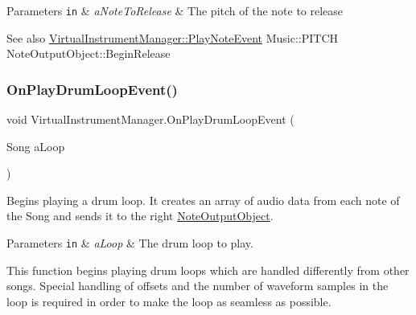 \begin{DoxyParams}[1]{Parameters}
\mbox{\tt in}  & {\em a\+Note\+To\+Release} & The pitch of the note to release\\
\hline
\end{DoxyParams}
\begin{DoxySeeAlso}{See also}
\hyperlink{class_virtual_instrument_manager_1_1_play_note_event}{Virtual\+Instrument\+Manager\+::\+Play\+Note\+Event} Music\+::\+P\+I\+T\+CH Note\+Output\+Object\+::\+Begin\+Release 
\end{DoxySeeAlso}
\mbox{\label{group___virtual_instrument_manager_event_types_gae2e2010b9a36ae2409466181ae0b9679}} 
\subsubsection{\texorpdfstring{On\+Play\+Drum\+Loop\+Event()}{OnPlayDrumLoopEvent()}}
{\footnotesize\ttfamily void Virtual\+Instrument\+Manager.\+On\+Play\+Drum\+Loop\+Event (\begin{DoxyParamCaption}\item[{Song}]{a\+Loop }\end{DoxyParamCaption})}



Begins playing a drum loop. It creates an array of audio data from each note of the Song and sends it to the right \hyperlink{class_note_output_object}{Note\+Output\+Object}. 


\begin{DoxyParams}[1]{Parameters}
\mbox{\tt in}  & {\em a\+Loop} & The drum loop to play.\\
\hline
\end{DoxyParams}
This function begins playing drum loops which are handled differently from other songs. Special handling of offsets and the number of waveform samples in the loop is required in order to make the loop as seamless as possible. \mbox{\label{group___virtual_instrument_manager_event_types_ga80b3821df3b1488a150f6062638f105c}} 
